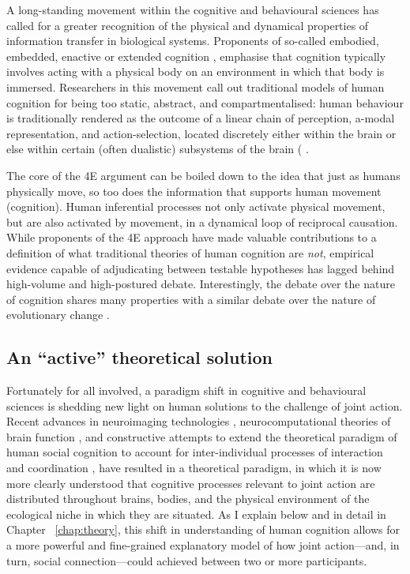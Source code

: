 \begin{CJK}{UTF8}{gbsn}
A long-standing movement within the cognitive and behavioural sciences has called for a greater recognition of the physical and dynamical properties of information transfer in biological systems.  Proponents of so-called embodied, embedded, enactive or extended cognition \citep[now collectively referred to as ``4E cognition,'' see][]{Menary2010}, emphasise that cognition typically involves acting with a physical body on an environment in which that body is immersed. Researchers in this movement call out traditional models of human cognition for being too static, abstract, and compartmentalised: human behaviour is traditionally rendered as the outcome of a linear chain of perception, a-modal representation, and action-selection, located discretely either within the brain or else within certain (often dualistic) subsystems of the brain ( \citep[e.g., emotional and cognitive, System 1 (fast) and System 2 (slow), implicit and explicit, and so on; cf.][]{Diennes1999,Kahneman2011}.

The core of the 4E argument can be boiled down to the idea that just as humans physically move, so too does the information that supports human movement (cognition).  Human inferential processes not only activate physical movement, but are also activated by movement, in a dynamical loop of reciprocal causation.  While proponents of the 4E approach have made valuable contributions to a definition of what traditional theories of human cognition are \textit{not}, empirical evidence capable of adjudicating between testable hypotheses has lagged behind high-volume and high-postured debate.  Interestingly, the debate over the nature of cognition shares many properties with a similar debate over the nature of evolutionary change \citep{Nowak2010,Scott-Phillips2011,Laland2014,Fuentes2016}.

\subsection{An ``active'' theoretical solution}
Fortunately for all involved, a paradigm shift in cognitive and behavioural sciences is shedding new light on human solutions to the challenge of joint action.  Recent advances in neuroimaging technologies \citep{Frith2007}, neurocomputational theories of brain function \citep{Friston2010,Frith2010,Yufik2013,Clark2013}, and constructive attempts to extend the theoretical paradigm of human social cognition to account for inter-individual processes of interaction and coordination \citep{Sebanz2006,Dale2014}, have resulted in a theoretical paradigm, in which it is now more clearly understood that cognitive processes relevant to joint action are distributed throughout brains, bodies, and the physical environment of the ecological niche in which they are situated.  As I explain below and in detail in Chapter ~\ref{chap:theory}, this shift in understanding of human cognition allows for a more powerful and fine-grained explanatory model of how joint action---and, in turn, social connection---could achieved between two or more participants.


\end{CJK}
